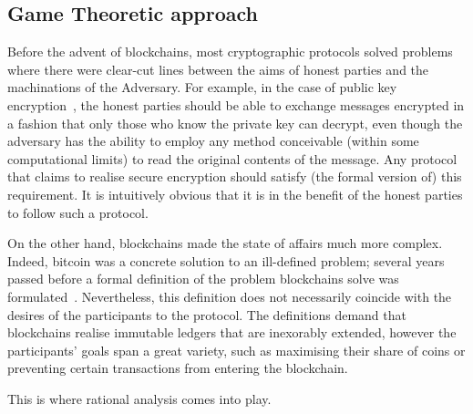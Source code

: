 \subsection{Game Theoretic approach}
  Before the advent of blockchains, most cryptographic protocols solved problems where
  there were clear-cut lines between the aims of honest parties and the machinations of
  the Adversary. For example, in the case of public key encryption~\cite{dh}, the honest
  parties should be able to exchange messages encrypted in a fashion that only those who
  know the private key can decrypt, even though the adversary has the ability to employ
  any method conceivable (within some computational limits) to read the original contents
  of the message. Any protocol that claims to realise secure encryption should satisfy
  (the formal version of) this requirement. It is intuitively obvious that it is in the
  benefit of the honest parties to follow such a protocol.

  On the other hand, blockchains made the state of affairs much more complex. Indeed,
  bitcoin was a concrete solution to an ill-defined problem; several years passed before a
  formal definition of the problem blockchains solve was formulated~\cite{backbone}.
  Nevertheless, this definition does not necessarily coincide with the desires of the
  participants to the protocol. The definitions demand that blockchains realise immutable
  ledgers that are inexorably extended, however the participants' goals span a great
  variety, such as maximising their share of coins or preventing certain transactions from
  entering the blockchain.

  This is where rational analysis comes into play.
